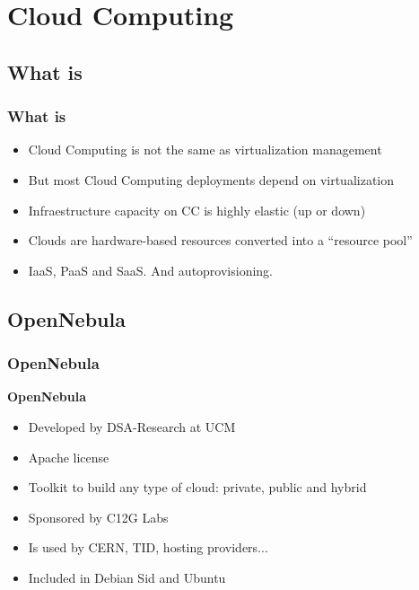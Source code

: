 \documentclass{beamer}
\begin{document}
\section{Cloud Computing}

  \subsection{What is}
  \begin{frame}
    \frametitle{What is}
    \begin{itemize}
      \item Cloud Computing is not the same as virtualization management
      \item But most Cloud Computing deployments depend on virtualization
      \item Infraestructure capacity on CC is highly elastic (up or down)
      \item Clouds are hardware-based resources converted into a ``resource pool''
      \item IaaS, PaaS and SaaS. And autoprovisioning.
    \end{itemize}
  \end{frame}
  
  \subsection{OpenNebula}
  \begin{frame}
    \frametitle{OpenNebula}
    \textbf{OpenNebula}
    \begin{itemize}
      \item Developed by DSA-Research at UCM
      \item Apache license
      \item Toolkit to build any type of cloud: private, public and hybrid
      \item Sponsored by C12G Labs
      \item Is used by CERN, TID, hosting providers...
      \item Included in Debian Sid and Ubuntu
    \end{itemize}
  \end{frame}

  
\end{document}
